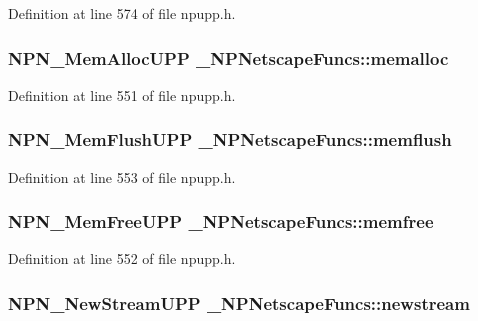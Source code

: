 Definition at line 574 of file npupp.h.

\hypertarget{struct___n_p_netscape_funcs_a5097004a4e957a8a19b8dab5b621d6a5}{
\subsubsection[{memalloc}]{\setlength{\rightskip}{0pt plus 5cm}NPN\_\-MemAllocUPP {\bf \_\-NPNetscapeFuncs::memalloc}}}
\label{struct___n_p_netscape_funcs_a5097004a4e957a8a19b8dab5b621d6a5}


Definition at line 551 of file npupp.h.

\hypertarget{struct___n_p_netscape_funcs_a5f7f7c54b1e720d7f3321d6e4e9e43ea}{
\subsubsection[{memflush}]{\setlength{\rightskip}{0pt plus 5cm}NPN\_\-MemFlushUPP {\bf \_\-NPNetscapeFuncs::memflush}}}
\label{struct___n_p_netscape_funcs_a5f7f7c54b1e720d7f3321d6e4e9e43ea}


Definition at line 553 of file npupp.h.

\hypertarget{struct___n_p_netscape_funcs_a2a3ffd689c7d1b70e6ed94e5fafb50c6}{
\subsubsection[{memfree}]{\setlength{\rightskip}{0pt plus 5cm}NPN\_\-MemFreeUPP {\bf \_\-NPNetscapeFuncs::memfree}}}
\label{struct___n_p_netscape_funcs_a2a3ffd689c7d1b70e6ed94e5fafb50c6}


Definition at line 552 of file npupp.h.

\hypertarget{struct___n_p_netscape_funcs_afe8b90e6099d477f62d78dd1ceb22e81}{
\subsubsection[{newstream}]{\setlength{\rightskip}{0pt plus 5cm}NPN\_\-NewStreamUPP {\bf \_\-NPNetscapeFuncs::newstream}}}
\label{struct___n_p_netscape_funcs_afe8b90e6099d477f62d78dd1ceb22e81}


